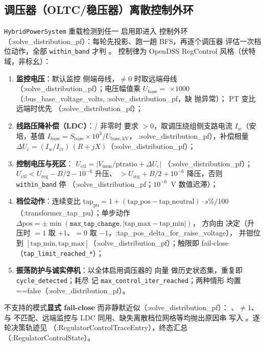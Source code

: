\subsection{调压器（OLTC/稳压器）离散控制外环}
\texttt{HybridPowerSystem} 重载检测到任一  启用即进入
控制外环（:solve\_distribution\_pf）：每轮先投影、跑一趟 BFS，再逐个调压器
评估一次档位动作，全部 \texttt{within\_band} 才判 。
控制律为 OpenDSS RegControl 风格（伏特域，非标幺）：

\begin{enumerate}
  \item \textbf{监控电压}：默认监控  侧端母线，$\neq0$
        时取远端母线（:solve\_distribution\_pf）；电压幅值乘 $U_{\mathrm{base}}=$
        $\times1000$（:bus\_base\_voltage\_volts, :solve\_distribution\_pf，缺  抛异常）；
        PT 变比远端时优先 （:solve\_distribution\_pf）；
  \item \textbf{线路压降补偿（LDC）}：/ 非零时
        要求 $>0$，取调压绕组侧支路电流
        $I_w$（安培，基值 $I_{\mathrm{base}}=S_{\mathrm{base}}\!\times\!10^{3}/U_{\mathrm{base,kV}}$，
        :solve\_distribution\_pf），补偿相量
        $\Delta U_c=(I_w/I_{\mathrm{ct}})\,(R+jX)$（:solve\_distribution\_pf）；
  \item \textbf{控制电压与死区}：
        $U_{\mathrm{ctl}}=\big|V_{\mathrm{mon}}/\mathrm{ptratio}+\Delta U_c\big|$
        （:solve\_distribution\_pf）；$U_{\mathrm{ctl}}<U_{\mathrm{reg}}-B/2-10^{-6}$ 升压、
        $>U_{\mathrm{reg}}+B/2+10^{-6}$ 降压，否则 \texttt{within\_band} 停
        （:solve\_distribution\_pf；$10^{-6}$~V 数值迟滞）；
  \item \textbf{档位动作}：连续变比
        $\mathrm{tap}_{\mathrm{pu}}=1+(\mathrm{tap\_pos}-\mathrm{tap\_neutral})\cdot s\%/100$
        （:transformer\_tap\_pu）；单步动作
        $\Delta\mathrm{pos}=\pm\min(\texttt{max\_tap\_change},|\mathrm{tap\_max}-\mathrm{tap\_min}|)$，
        方向由  决定（升压时 $=1$ 取 $+1$、$=0$ 取 $-1$，:tap\_pos\_delta\_for\_raise\_voltage），
        并钳位到 $[\mathrm{tap\_min},\mathrm{tap\_max}]$（:solve\_distribution\_pf）；触限即
        fail-close（\texttt{tap\_limit\_reached\_*}）；
  \item \textbf{振荡防护与诚实停机}：以全体启用调压器的  向量
        做历史状态集，重复即 \texttt{cycle\_detected}；耗尽
         记 \texttt{max\_control\_iter\_reached}；两种情形
        均置 ==false（:solve\_distribution\_pf）。
\end{enumerate}
不支持的模式\textbf{显式 fail-close} 而非静默近似（:solve\_distribution\_pf）：
、$\neq1$、 与
 不匹配、远端监控与 LDC 同用、缺失离散档位网格等均抛出原因串
写入 。逐轮决策轨迹见 
（:RegulatorControlTraceEntry），终态汇总 （:RegulatorControlState）。

